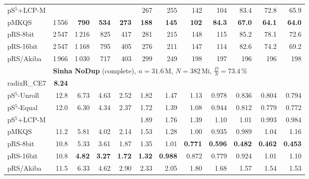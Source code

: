 \documentclass[a4paper]{myjournal}
\begin{document}
\begin{table}
\begin{tabular}{l|*{11}{r}|@{}}
 pS$^5$+LCP-M &        &         &         &         &     267 &     255 &     142 &      104 &     83.4 &     72.8 &     65.9 \\
        pMKQS & 1\,556 & \bf 790 & \bf 534 & \bf 273 & \bf 188 & \bf 145 & \bf 102 & \bf 84.3 & \bf 67.0 & \bf 64.1 & \bf 64.0 \\
     pRS-8bit & 2\,547 &  1\,216 &     825 &     417 &     281 &     215 &     148 &      115 &     85.2 &     78.1 &     72.6 \\
    pRS-16bit & 2\,547 &  1\,168 &     795 &     405 &     276 &     211 &     147 &      114 &     82.6 &     74.2 &     69.2 \\
    pRS/Akiba & 1\,966 &  1\,030 &     717 &     403 &     299 &     249 &     198 &      197 &      196 &      196 &      198 \\ \hline
& \multicolumn{11}{l|}{\textbf{Sinha NoDup} (complete), $n = 31.6\,\text{M}$, $N = 382\,\text{Mi}$, $\frac{D}{N} = 73.4\,\%$} \\ \cline{2-12}
radixR\_CE7 & \bf 8.24 &  &  &  &  &  &  &  &  &  &  \\
pS$^5$-Unroll & 12.8 &     6.73 &     4.63 &     2.52 &     1.82 &      1.47 &      1.13 &     0.978 &     0.836 &     0.804 &     0.794 \\
 pS$^5$-Equal & 12.0 &     6.30 &     4.34 &     2.37 &     1.72 &      1.39 &      1.08 &     0.944 &     0.812 &     0.779 &     0.772 \\
 pS$^5$+LCP-M &      &          &          &          &     1.89 &      1.76 &      1.39 &      1.10 &      1.01 &     0.993 &     0.984 \\
        pMKQS & 11.2 &     5.81 &     4.02 &     2.14 &     1.53 &      1.28 &      1.00 &     0.935 &     0.989 &      1.04 &      1.16 \\
     pRS-8bit & 10.8 &     5.33 &     3.61 &     1.87 &     1.35 &      1.01 & \bf 0.771 & \bf 0.596 & \bf 0.482 & \bf 0.462 & \bf 0.453 \\
    pRS-16bit & 10.8 & \bf 4.82 & \bf 3.27 & \bf 1.72 & \bf 1.32 & \bf 0.988 &     0.872 &     0.779 &     0.924 &      1.01 &      1.10 \\
    pRS/Akiba & 11.5 &     6.33 &     4.62 &     2.90 &     2.33 &      2.05 &      1.80 &      1.68 &      1.57 &      1.54 &      1.53 \\ \hline
\end{tabular}
\end{table}
\end{document}
